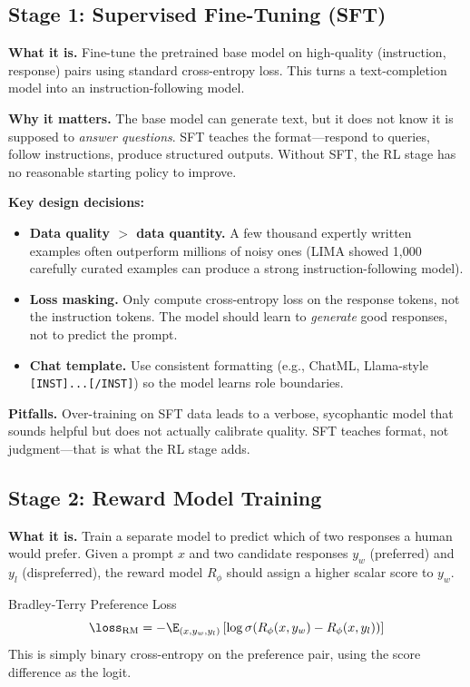 \subsection{Stage 1: Supervised Fine-Tuning (SFT)}

\textbf{What it is.} Fine-tune the pretrained base model on high-quality (instruction, response) pairs using standard cross-entropy loss. This turns a text-completion model into an instruction-following model.

\textbf{Why it matters.} The base model can generate text, but it does not know it is supposed to \textit{answer questions}. SFT teaches the format---respond to queries, follow instructions, produce structured outputs. Without SFT, the RL stage has no reasonable starting policy to improve.

\textbf{Key design decisions:}
\begin{itemize}
    \item \textbf{Data quality $>$ data quantity.} A few thousand expertly written examples often outperform millions of noisy ones (LIMA showed 1,000 carefully curated examples can produce a strong instruction-following model).
    \item \textbf{Loss masking.} Only compute cross-entropy loss on the response tokens, not the instruction tokens. The model should learn to \textit{generate} good responses, not to predict the prompt.
    \item \textbf{Chat template.} Use consistent formatting (e.g., ChatML, Llama-style \texttt{[INST]...[/INST]}) so the model learns role boundaries.
\end{itemize}

\textbf{Pitfalls.} Over-training on SFT data leads to a verbose, sycophantic model that sounds helpful but does not actually calibrate quality. SFT teaches format, not judgment---that is what the RL stage adds.

\subsection{Stage 2: Reward Model Training}

\textbf{What it is.} Train a separate model to predict which of two responses a human would prefer. Given a prompt $x$ and two candidate responses $y_w$ (preferred) and $y_l$ (dispreferred), the reward model $R_\phi$ should assign a higher scalar score to $y_w$.

\begin{mathresult}{Bradley-Terry Preference Loss}
\begin{equation}
\loss_{\text{RM}} = -\E_{(x, y_w, y_l)}\left[\log \sigma\!\left(R_\phi(x, y_w) - R_\phi(x, y_l)\right)\right]
\end{equation}
This is simply binary cross-entropy on the preference pair, using the score difference as the logit.
\end{mathresult}

